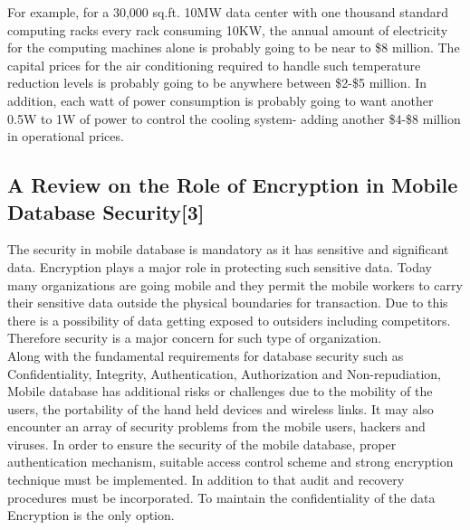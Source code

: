 \documentclass[12pt, a4paper]{article}
\begin{document}
\hspace{5mm}For example, for a 30,000 sq.ft. 10MW data center with one thousand standard computing racks every rack consuming 10KW, the annual amount of electricity for the computing machines alone is probably going to be near to \$8 million. The capital prices for the air conditioning required to handle such temperature reduction levels is probably going to be anywhere between \$2-\$5 million. In addition, each watt of power consumption is probably going to want another 0.5W to 1W of power to control the cooling system- adding another \$4-\$8 million in operational prices.

\vspace{5mm}
\subsection{A Review on the Role of Encryption in Mobile Database Security[3]}

\vspace{5mm}
\hspace{5mm}The security in mobile database is mandatory as it has sensitive and significant data. Encryption plays a major role in protecting such sensitive data. Today many organizations are going mobile and they permit the mobile workers to carry their sensitive data outside the physical boundaries for transaction. Due to this there is a possibility of data getting exposed to outsiders including competitors. Therefore security is a major concern for such type of organization.
\\
\hspace{5mm}Along with the fundamental requirements for database security such as Confidentiality, Integrity, Authentication, Authorization and Non-repudiation, Mobile database has additional risks or challenges due to the mobility of the users, the portability of the hand held devices and wireless links. It may also encounter an array of security problems from the mobile users, hackers and viruses. In order to ensure the security of the mobile database, proper authentication mechanism, suitable access control scheme and strong encryption technique must be implemented. In addition to that audit and recovery procedures must be incorporated. To maintain the confidentiality of the data Encryption is the only option.

\vspace{5mm}
\end{document}
